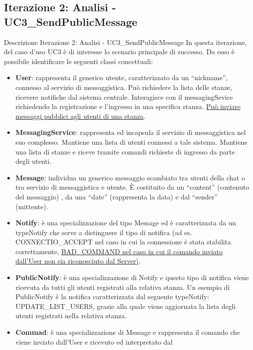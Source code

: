 \documentclass[t]{beamer} %
\let\olditem=\item%
\renewcommand{\item}{\olditem \justifying}%
\begin{document}
\subsection {Iterazione 2: Analisi - UC3\_SendPublicMessage}
\begin{frame} [allowframebreaks] {Descrizione Iterazione 2: Analisi - UC3\_SendPublicMessage}
  In questa iterazione, del caso d’uso UC3 è di interesse lo scenario principale di successo.  Da esso è possibile identificare le seguenti classi concettuali: 
  \begin{itemize}
   \item \textbf{User}: rappresenta il generico utente, caratterizzato da un ``nickname'', connesso al servizio di messaggistica. Può richiedere la lista delle 
         stanze, ricevere notifiche dal sistema centrale. Interagisce con il messagingSevice richiedendo la registrazione e l’ingresso in una specifica stanza. 
         \underline{Può inviare messaggi pubblici agli utenti di una stanza}.
   \item \textbf{MessagingService}: rappresenta ed incapsula il servizio di messaggistica nel suo complesso. Mantiene una lista di utenti connessi a tale sistema. 
         Mantiene una lista di stanze e riceve tramite comandi richieste di ingresso da parte degli utenti.
   \item \textbf{Message}: individua un generico messaggio scambiato tra utenti della chat o tra servizio di messaggistica e utente. È costituito da un 
         ``content'' (contenuto del messaggio) , da una ``date'' (rappresenta la data) e dal ``sender'' (mittente).
   \item \textbf{Notify}: è una specializzazione del tipo Message ed è caratterizzata da un typeNotify che serve a distinguere il tipo di notifica (ad es. 
          CONNECTIO\_ACCEPT nel caso in cui la connessione è stata stabilita correttamente, \underline{BAD\_COMMAND nel caso in cui il comando inviato dall'User non 
          sia riconosciuto dal Server)}.
    \item \textbf{PublicNotify}: è una specializzazione di Notify e questo tipo di notifica viene ricevuta da tutti gli utenti registrati alla relativa 
          stanza. Un esempio di PublicNotify è la notifica caratterizzata dal seguente typeNotify: UPDATE\_LIST\_USERS, grazie alla quale viene 
          aggiornata la lista degli utenti registrati nella relativa stanza.
   \item  \textbf{Commad}: è una specializzazione di Message e rappresenta il comando che viene inviato dall'User e ricevuto ed interpretato dal            

\end{itemize}
\end{frame}
\end{document}
